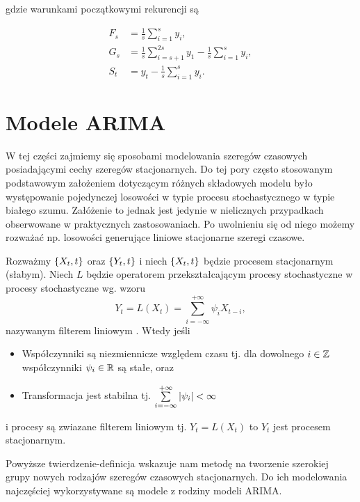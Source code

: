 \documentclass[10pt,a4paper]{book}
\begin{document}
gdzie warunkami początkowymi rekurencji są 

\begin{align*}
F_s &= \frac{1}{s} \sum_{i=1}^{s} y_i,\\
G_s &= \frac{1}{s} \sum_{i=s+1}^{2s} y_1 - \frac{1}{s} \sum_{i=1}^{s} y_i,\\
S_t &= y_t - \frac{1}{s} \sum_{i=1}^{s} y_i.
\end{align*}

\chapter{Modele ARIMA}

W tej części zajmiemy się sposobami modelowania szeregów czasowych posiadającymi cechy szeregów stacjonarnych. Do tej pory często stosowanym podstawowym założeniem dotyczącym różnych składowych modelu było występowanie pojedynczej losowości w typie procesu stochastycznego w typie białego szumu. Załóżenie to jednak jest jedynie w nielicznych przypadkach obserwowane w praktycznych zastosowaniach. Po uwolnieniu się od niego możemy rozważać np. losowości generujące liniowe stacjonarne szeregi czasowe.

\begin{definition} \label{definition-linear-stationary-model}
Rozważmy $\left\lbrace {{X_t}, {t}} \right\rbrace$ oraz $\left\lbrace {{Y_t}, {t}} \right\rbrace$ i niech $\left\lbrace {{X_t}, {t}} \right\rbrace$ będzie procesem stacjonarnym (słabym). Niech $L$ będzie operatorem przekształcającym procesy stochastyczne w procesy stochastyczne wg. wzoru
$$
Y_t = L(X_t) = \sum_{i=-\infty}^{+\infty} \psi_i X_{t-i},
$$
nazywanym filterem liniowym . Wtedy jeśli
\begin{itemize}
\item Współczynniki są niezmiennicze względem czasu tj. dla dowolnego $i \in \mathbb{Z}$ współczynniki $\psi_i \in \mathbb{R}$ są stałe, oraz
\item Transformacja jest stabilna tj. $ \sum_{i=-\infty}^{+\infty}\abs{\psi_i} < \infty$
\end{itemize}
i procesy są zwiazane filterem liniowym tj. $Y_t = L(X_t)$ to $Y_t$ jest procesem stacjonarnym.
\end{definition} 

Powyższe twierdzenie-definicja wskazuje nam metodę na tworzenie szerokiej grupy nowych rodzajów szeregów czasowych stacjonarnych. Do ich modelowania najczęściej wykorzystywane są modele z rodziny modeli ARIMA.
\end{document}
